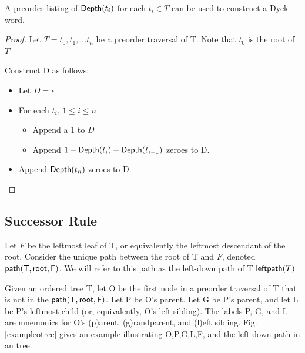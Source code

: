 \begin{remark}A preorder listing of $\mathsf{Depth}{(t_i)} $ for each $ t_i \in T$ can be used to construct a Dyck word. \label{re:construct_dyck}

\end{remark} 
\begin{proof}

    Let $T=t_0,t_1,...t_n$ be a preorder traversal of T.  Note that $t_0$ is the root of $T$

    Construct D as follows: 

    \begin{itemize}
	\item Let $D=\epsilon$ %
	\item For each $t_i$, $1\le i \le n$
	    \begin{itemize}
		\item Append a 1 to $D$
		\item Append $1-\mathsf{Depth}{(t_{i})}+\mathsf{Depth}{(t_{i-1})}$ zeroes to D.
	    \end{itemize}
	\item Append $\mathsf{Depth}{(t_{n})}$ zeroes to D. 
    \end{itemize}
\end{proof} 
\subsection{Successor Rule}

Let $F$ be the leftmost leaf of T, or equivalently the leftmost descendant of the root. Consider the unique path between the root of T and $F$, denoted $\mathsf{path({T}, root, F)}$. We will refer to this path as the left-down path of T $\mathsf{leftpath}{(T)}$


Given an ordered tree T, let O be the first node in a preorder traversal of T that is not in the $\mathsf{path({T}, root, F)}$. Let P be O's parent.  Let G be P's parent, and let L be P's leftmost child (or, equivalently, O's left sibling).  The labels P, G, and L are mnemonics for O's (p)arent, (g)randparent, and (l)eft sibling. 
Fig. \ref{exampleotree} gives an example illustrating O,P,G,L,F, and the left-down path in an tree.

